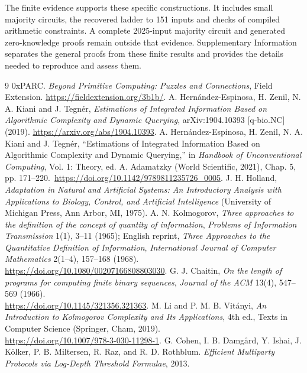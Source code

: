\documentclass[11pt,a4paper]{article}
\begin{document}
The finite evidence supports these specific constructions. It includes
small majority circuits, the recovered ladder to 151 inputs and checks of
compiled arithmetic constraints. A complete 2025-input majority circuit and
generated zero-knowledge proofs remain outside that evidence. Supplementary
Information separates
the general proofs from these finite results and provides the details
needed to reproduce and assess them.
\begin{thebibliography}{9}
 0xPARC. \emph{Beyond Primitive Computing: Puzzles and Connections}, Field Extension.
\url{https://fieldextension.org/3b1b/}.
 A. Hernández-Espinosa, H. Zenil, N. A. Kiani and
J. Tegnér, \emph{Estimations of Integrated Information Based on Algorithmic
Complexity and Dynamic Querying}, arXiv:1904.10393 [q-bio.NC] (2019).
\url{https://arxiv.org/abs/1904.10393}.
 A. Hernández-Espinosa, H. Zenil, N. A. Kiani and
J. Tegnér, ``Estimations of Integrated Information Based on Algorithmic
Complexity and Dynamic Querying,'' in \emph{Handbook of Unconventional
Computing}, Vol. 1: Theory, ed. A. Adamatzky (World Scientific, 2021), Chap. 5,
pp. 171--220.\ \url{https://doi.org/10.1142/9789811235726_0005}.
 J. H. Holland, \emph{Adaptation in Natural and
Artificial Systems: An Introductory Analysis with Applications to Biology,
Control, and Artificial Intelligence} (University of Michigan Press,
Ann Arbor, MI, 1975).
 A. N. Kolmogorov, \emph{Three approaches to the
definition of the concept of quantity of information}, \emph{Problems of
Information Transmission} 1(1), 3--11 (1965); English reprint,
\emph{Three Approaches to the Quantitative Definition of Information},
\emph{International Journal of Computer Mathematics} 2(1--4), 157--168
(1968).\\ \url{https://doi.org/10.1080/00207166808803030}.
 G. J. Chaitin, \emph{On the length of programs for
computing finite binary sequences}, \emph{Journal of the ACM} 13(4),
547--569 (1966).\\ \url{https://doi.org/10.1145/321356.321363}.
 M. Li and P. M. B. Vitányi, \emph{An Introduction to
Kolmogorov Complexity and Its Applications}, 4th ed., Texts in Computer
Science (Springer, Cham, 2019).\\ \url{https://doi.org/10.1007/978-3-030-11298-1}.
 G. Cohen, I. B. Damg\aa rd, Y. Ishai, J. K\"olker,
P. B. Miltersen, R. Raz, and R. D. Rothblum.
\emph{Efficient Multiparty Protocols via Log-Depth Threshold Formulae}, 2013.

\end{thebibliography}
\end{document}
